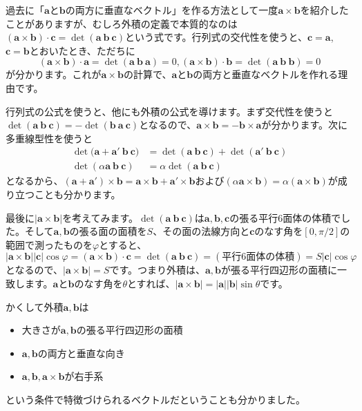 過去に「$\bm{a}$と$\bm{b}$の両方に垂直なベクトル」を作る方法として一度$\bm{a} \times \bm{b}$を紹介したことがありますが、むしろ外積の定義で本質的なのは$(\bm{a} \times \bm{b}) \cdot \bm{c} = \det(\bm{a} \ \bm{b} \ \bm{c})$という式です。行列式の交代性を使うと、$\bm{c} = \bm{a}$, $\bm{c} = \bm{b}$とおいたとき、ただちに
\[
(\bm{a} \times \bm{b}) \cdot \bm{a} = \det(\bm{a} \ \bm{b} \ \bm{a}) = 0, 
(\bm{a} \times \bm{b}) \cdot \bm{b} = \det(\bm{a} \ \bm{b} \ \bm{b}) = 0
\]
が分かります。これが$\bm{a} \times \bm{b}$の計算で、$\bm{a}$と$\bm{b}$の両方と垂直なベクトルを作れる理由です。

行列式の公式を使うと、他にも外積の公式を導けます。まず交代性を使うと$\det(\bm{a} \ \bm{b} \ \bm{c}) = - \det(\bm{b} \ \bm{a} \ \bm{c})$となるので、$\bm{a} \times \bm{b} = - \bm{b} \times \bm{a}$が分かります。次に多重線型性を使うと
\begin{align*}
\det\bigl(\bm{a} + \bm{a}'  \ \bm{b} \ \bm{c}\bigr) &= \det(\bm{a} \ \bm{b} \ \bm{c}) + \det(\bm{a}' \ \bm{b} \ \bm{c}) \\
\det(\alpha \bm{a} \ \bm{b} \ \bm{c}) &= \alpha \det(\bm{a} \ \bm{b} \ \bm{c})
\end{align*}
となるから、$(\bm{a} + \bm{a}') \times \bm{b} = \bm{a} \times \bm{b} + \bm{a}' \times \bm{b}$および$(\alpha \bm{a} \times \bm{b}) = \alpha (\bm{a} \times \bm{b})$が成り立つことも分かります。

最後に$|\bm{a} \times \bm{b}|$を考えてみます。$\det(\bm{a} \ \bm{b} \ \bm{c})$は$\bm{a}, \bm{b}, \bm{c}$の張る平行$6$面体の体積でした。そして$\bm{a}, \bm{b}$の張る面の面積を$S$、その面の法線方向と$\bm{c}$のなす角を$[0, \pi/2]$の範囲で測ったものを$\varphi$とすると、
\[
|\bm{a} \times \bm{b}| |\bm{c}| \cos \varphi = (\bm{a} \times \bm{b}) \cdot \bm{c} = \det(\bm{a} \ \bm{b} \ \bm{c}) = (\text{平行$6$面体の体積}) = S|\bm{c}| \cos \varphi
\]
となるので、$|\bm{a} \times \bm{b}| = S$です。つまり外積は、$\bm{a}, \bm{b}$が張る平行四辺形の面積に一致します。$\bm{a}$と$\bm{b}$のなす角を$\theta$とすれば、$|\bm{a} \times \bm{b}| = |\bm{a}||\bm{b}|\sin\theta$です。

かくして外積$\bm{a}, \bm{b}$は
\begin{itemize}
\item 大きさが$\bm{a}, \bm{b}$の張る平行四辺形の面積
\item $\bm{a}, \bm{b}$の両方と垂直な向き
\item $\bm{a}, \bm{b}, \bm{a} \times \bm{b}$が右手系
\end{itemize}
という条件で特徴づけられるベクトルだということも分かりました。

